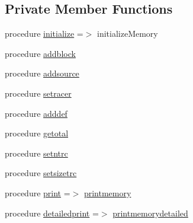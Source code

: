 \subsection*{Private Member Functions}
\begin{DoxyCompactItemize}
\item 
procedure \mbox{\hyperlink{structsimulationmemory__mod_1_1memory__t_a4a5512e8fc794f1efb4a96815ce5bdad}{initialize}} =$>$ initialize\+Memory
\item 
procedure \mbox{\hyperlink{structsimulationmemory__mod_1_1memory__t_af4369c1b67450c093ccfb2837e709c3c}{addblock}}
\item 
procedure \mbox{\hyperlink{structsimulationmemory__mod_1_1memory__t_a6d2351fb033ce9893d273691db102d08}{addsource}}
\item 
procedure \mbox{\hyperlink{structsimulationmemory__mod_1_1memory__t_a47a1415617c756d44e330035acd0c825}{setracer}}
\item 
procedure \mbox{\hyperlink{structsimulationmemory__mod_1_1memory__t_a9024c06137d2b62198dc8c29a97d18a3}{adddef}}
\item 
procedure \mbox{\hyperlink{structsimulationmemory__mod_1_1memory__t_a87c33934f9464a2fcd66dd416aad3a2f}{getotal}}
\item 
procedure \mbox{\hyperlink{structsimulationmemory__mod_1_1memory__t_adf5a441d0b11953db16ca75aa7c01b09}{setntrc}}
\item 
procedure \mbox{\hyperlink{structsimulationmemory__mod_1_1memory__t_a25128ba01ed2359e4215b9cbbee746a9}{setsizetrc}}
\item 
procedure \mbox{\hyperlink{structsimulationmemory__mod_1_1memory__t_a24c0fb4f4dd83b64e30a8e6213ec459f}{print}} =$>$ \mbox{\hyperlink{namespacesimulationmemory__mod_a5b7c22d236e24b59599f705f63ba3c09}{printmemory}}
\item 
procedure \mbox{\hyperlink{structsimulationmemory__mod_1_1memory__t_a909f0aceaaee770e5a20e3878651dfda}{detailedprint}} =$>$ \mbox{\hyperlink{namespacesimulationmemory__mod_a9e12442b1b7b5d105cd70686e04106d3}{printmemorydetailed}}
\end{DoxyCompactItemize}
